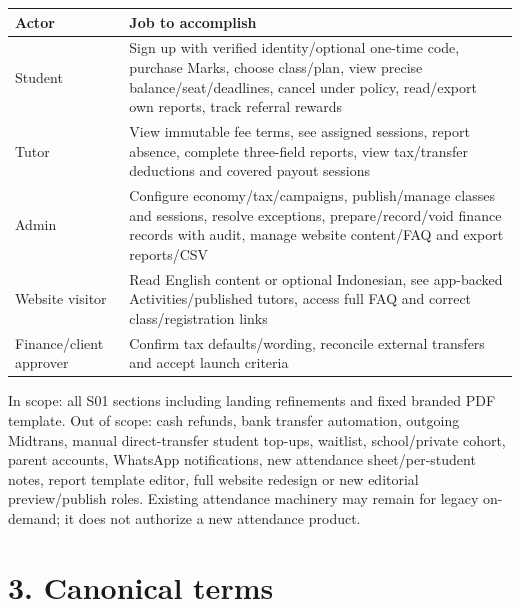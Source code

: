 \documentclass[11pt,a4paper]{article}
\newcounter{none}
\begin{document}
{\def\LTcaptype{none} %
\begin{longtable}[]{@{}
  >{\raggedright\arraybackslash}p{}
  >{\raggedright\arraybackslash}p{}@{}}
\toprule\noalign{}
\begin{minipage}[b]{\linewidth}\raggedright
Actor
\end{minipage} & \begin{minipage}[b]{\linewidth}\raggedright
Job to accomplish
\end{minipage} \\
\midrule\noalign{}
\endhead
\bottomrule\noalign{}
\endlastfoot
Student & Sign up with verified identity/optional one-time code, purchase Marks, choose class/plan, view precise balance/seat/deadlines, cancel under policy, read/export own reports, track referral rewards \\
Tutor & View immutable fee terms, see assigned sessions, report absence, complete three-field reports, view tax/transfer deductions and covered payout sessions \\
Admin & Configure economy/tax/campaigns, publish/manage classes and sessions, resolve exceptions, prepare/record/void finance records with audit, manage website content/FAQ and export reports/CSV \\
Website visitor & Read English content or optional Indonesian, see app-backed Activities/published tutors, access full FAQ and correct class/registration links \\
Finance/client approver & Confirm tax defaults/wording, reconcile external transfers and accept launch criteria \\
\end{longtable}
}

In scope: all S01 sections including landing refinements and fixed branded PDF template. Out of scope: cash refunds, bank transfer automation, outgoing Midtrans, manual direct-transfer student top-ups, waitlist, school/private cohort, parent accounts, WhatsApp notifications, new attendance sheet/per-student notes, report template editor, full website redesign or new editorial preview/publish roles. Existing attendance machinery may remain for legacy on-demand; it does not authorize a new attendance product.

\section{3. Canonical terms}\label{canonical-terms}
\end{document}
